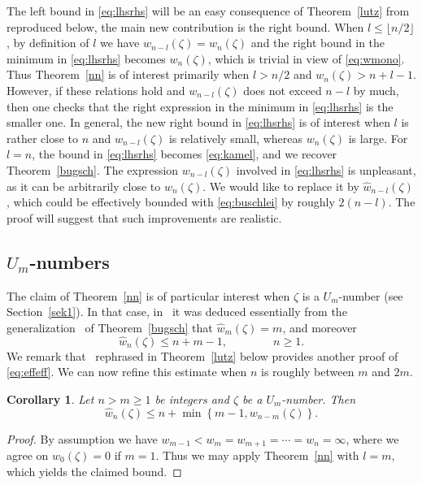 \documentclass[12pt]{amsart}
\newtheorem{corollary}[theorem]{Corollary}
\theoremstyle{definition}
\begin{document}
The left bound in \eqref{eq:lhsrhs} will be an easy consequence of Theorem~\ref{lutz} from \cite{buschl}
reproduced below, the main new contribution is the right bound. When $l\leq \lfloor n/2\rfloor$, by definition of $l$ we have 
$w_{n-l}(\zeta)=w_{n}(\zeta)$ and the right
bound in the minimum in \eqref{eq:lhsrhs} becomes $w_{n}(\zeta)$, which is trivial in view of \eqref{eq:wmono}. Thus
Theorem~\ref{nn} is of interest primarily when $l>n/2$ 
and $w_{n}(\zeta)>n+l-1$.
However, if these relations hold and $w_{n-l}(\zeta)$ does not exceed $n-l$ by much,
then one checks that the right expression in the minimum in \eqref{eq:lhsrhs} is the smaller one.
In general, the new right bound in \eqref{eq:lhsrhs} is 
of interest when 
$l$ is rather close to $n$ and $w_{n-l}(\zeta)$ is relatively small, whereas $w_{n}(\zeta)$ is large.
For $l=n$, the bound in \eqref{eq:lhsrhs} becomes \eqref{eq:kamel},
and we recover Theorem~\ref{bugsch}. 
The expression $w_{n-l}(\zeta)$ involved in \eqref{eq:lhsrhs}
is unpleasant, as it can be arbitrarily close to $w_{n}(\zeta)$. We would like to replace it by $\widehat{w}_{n-l}(\zeta)$,
which could be effectively bounded with \eqref{eq:buschlei} by roughly $2(n-l)$. The proof will suggest
that such improvements are realistic. 

\subsection{$U_{m}$-numbers}
The claim of Theorem~\ref{nn} is of particular interest
when $\zeta$ is a $U_{m}$-number (see Section~\ref{sek1}).
In that case,
in~\cite[Corollary~2.5]{buschl} it was deduced essentially
from the generalization~\cite[Theorem~2.3]{buschl} of
Theorem~\ref{bugsch}
that $\widehat{w}_{m}(\zeta)=m$, and 
moreover
\begin{equation} \label{eq:effeff}
\widehat{w}_{n}(\zeta)\leq n+m-1,  \qquad\qquad n\geq 1.
\end{equation}
We remark that~\cite[Theorem~2.3]{buschl} rephrased in 
Theorem~\ref{lutz} below provides another proof of \eqref{eq:effeff}.
We can now refine this estimate when $n$ is roughly 
between $m$ and $2m$.

\begin{corollary} \label{jawasdenn}
Let $n>m\geq 1$ be integers and $\zeta$ be a $U_{m}$-number. Then
\[
\widehat{w}_{n}(\zeta)\leq n+ \min \left\{m-1, w_{n-m}(\zeta) \right\}.
\]
\end{corollary}

\begin{proof}
By assumption we have $w_{m-1}<w_{m}=w_{m+1}=\cdots=w_{n}=\infty$,
where we agree on $w_{0}(\zeta)=0$ if $m=1$.
Thus we may apply Theorem~\ref{nn} with $l=m$, which yields the
claimed bound.
\end{proof}
\end{document}
